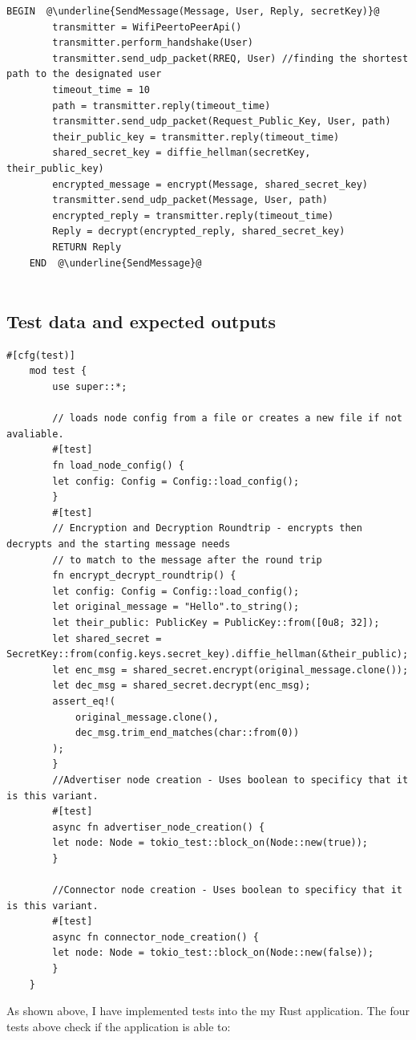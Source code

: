 \documentclass[a4paper, titlepage]{article}
\begin{document}
\begin{lstlisting}[caption=Send Data Packets over Network, escapechar=\@]
	BEGIN  @\underline{SendMessage(Message, User, Reply, secretKey)}@
		transmitter = WifiPeertoPeerApi()
		transmitter.perform_handshake(User)
		transmitter.send_udp_packet(RREQ, User) //finding the shortest path to the designated user
		timeout_time = 10
		path = transmitter.reply(timeout_time)
		transmitter.send_udp_packet(Request_Public_Key, User, path)
		their_public_key = transmitter.reply(timeout_time)
		shared_secret_key = diffie_hellman(secretKey, their_public_key)
		encrypted_message = encrypt(Message, shared_secret_key)
		transmitter.send_udp_packet(Message, User, path)
		encrypted_reply = transmitter.reply(timeout_time)
		Reply = decrypt(encrypted_reply, shared_secret_key)
		RETURN Reply
	END  @\underline{SendMessage}@
			
\end{lstlisting}

\vfill{}

\subsection{Test data and expected outputs}
\begin{lstlisting}[caption=Rust Tests, escapechar=\@]
	#[cfg(test)]
	mod test {
	    use super::*;

	    // loads node config from a file or creates a new file if not avaliable.
	    #[test]
	    fn load_node_config() {
		let config: Config = Config::load_config();
	    }
	    #[test]
	    // Encryption and Decryption Roundtrip - encrypts then decrypts and the starting message needs
	    // to match to the message after the round trip
	    fn encrypt_decrypt_roundtrip() {
		let config: Config = Config::load_config();
		let original_message = "Hello".to_string();
		let their_public: PublicKey = PublicKey::from([0u8; 32]);
		let shared_secret = SecretKey::from(config.keys.secret_key).diffie_hellman(&their_public);
		let enc_msg = shared_secret.encrypt(original_message.clone());
		let dec_msg = shared_secret.decrypt(enc_msg);
		assert_eq!(
		    original_message.clone(),
		    dec_msg.trim_end_matches(char::from(0))
		);
	    }
	    //Advertiser node creation - Uses boolean to specificy that it is this variant.
	    #[test]
	    async fn advertiser_node_creation() {
		let node: Node = tokio_test::block_on(Node::new(true));
	    }

	    //Connector node creation - Uses boolean to specificy that it is this variant.
	    #[test]
	    async fn connector_node_creation() {
		let node: Node = tokio_test::block_on(Node::new(false));
	    }
	}
\end{lstlisting}
\renewcommand{\rmdefault}{cmr}
As shown above, I have implemented tests into the my Rust application. The four tests above check if the application is able to: \\
\end{document}
